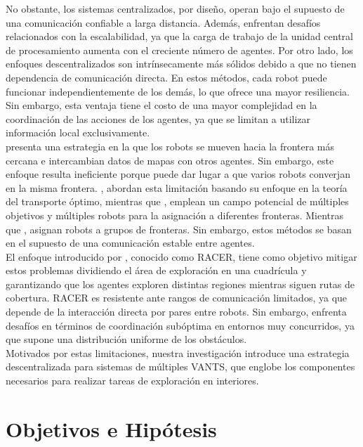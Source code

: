 \documentclass[sigconf]{acmart}
\begin{document}
No obstante, los sistemas centralizados, por diseño, operan bajo el supuesto de una comunicación confiable a larga distancia. Además, enfrentan desafíos relacionados con la escalabilidad, ya que la carga de trabajo de la unidad central de procesamiento aumenta con el creciente número de agentes. Por otro lado, los enfoques descentralizados son intrínsecamente más sólidos debido a que no tienen dependencia de comunicación directa. En estos métodos, cada robot puede funcionar independientemente de los demás, lo que ofrece una mayor resiliencia. Sin embargo, esta ventaja tiene el costo de una mayor complejidad en la coordinación de las acciones de los agentes, ya que se limitan a utilizar información local exclusivamente.\\

\citeauthor{YAMAUCHI1997} \cite{YAMAUCHI1997} presenta una estrategia en la que los robots se mueven hacia la frontera más cercana e intercambian datos de mapas con otros agentes. Sin embargo, este enfoque resulta ineficiente porque puede dar lugar a que varios robots converjan en la misma frontera. \citeauthor{9483227} \cite{9483227}, abordan esta limitación basando su enfoque en la teoría del transporte óptimo, mientras que \citeauthor{9561328} \cite{9561328}, emplean un campo potencial de múltiples objetivos y múltiples robots para la asignación a diferentes fronteras. Mientras que \citeauthor{9561226} \cite{9561226}, asignan robots a grupos de fronteras. Sin embargo, estos métodos se basan en el supuesto de una comunicación estable entre agentes.\\

El enfoque introducido por \citeauthor{RACER2022} \cite{RACER2022}, conocido como RACER, tiene como objetivo mitigar estos problemas dividiendo el área de exploración en una cuadrícula y garantizando que los agentes exploren distintas regiones mientras siguen rutas de cobertura. RACER es resistente ante rangos de comunicación limitados, ya que depende de la interacción directa por pares entre robots. Sin embargo, enfrenta desafíos en términos de coordinación subóptima en entornos muy concurridos, ya que supone una distribución uniforme de los obstáculos.\\

Motivados por estas limitaciones, nuestra investigación introduce una estrategia descentralizada para sistemas de múltiples VANTS, que englobe los componentes necesarios para realizar tareas de exploración en interiores.

\section{Objetivos e Hipótesis}
\end{document}
